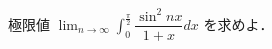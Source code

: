 \documentclass[../../main.tex]{subfiles}
\begin{document}
極限値 $\displaystyle \lim_{n \to \infty} \int_0^{\frac{\pi}{2}} \dfrac{\sin^2 nx}{1+x} dx$ を求めよ．
\end{document}
